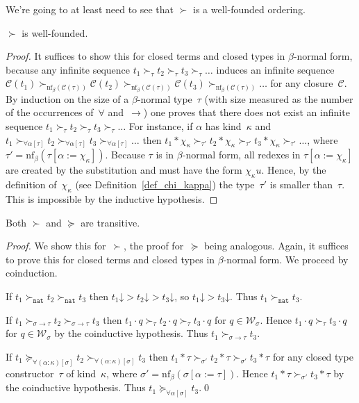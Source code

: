 \documentclass[runningheads,a4paper]{llncs}
\newcommand{\World}{\mathcal{W}}
\newcommand{\cl}{\mathcal{C}}
\newcommand{\nf}{\mathrm{nf}}
\newcommand{\arrtype}{\rightarrow}
\newcommand{\app}[2]{#1 \cdot #2}
\newcommand{\tapp}[2]{#1 * #2}
\newcommand{\subst}[2]{#1:=#2}
\newcommand{\nat}{\mathtt{nat}}
\newcommand{\da}{\mathord{\downarrow}}
\begin{document}
We're going to at least need to see that $\succ$ is a well-founded
ordering.

\begin{lemma}
  $\succ$ is well-founded.
\end{lemma}

\begin{proof}
  It suffices to show this for closed terms and closed types in
  $\beta$-normal form, because any infinite sequence $t_1 \succ_\tau
  t_2 \succ_\tau t_3 \succ_\tau \ldots$ induces an infinite sequence
  $\cl(t_1) \succ_{\nf_\beta(\cl(\tau))} \cl(t_2)
  \succ_{\nf_\beta(\cl(\tau))} \cl(t_3) \succ_{\nf_\beta(\cl(\tau))}
  \ldots$ for any closure~$\cl$. By induction on the size of a
  $\beta$-normal type~$\tau$ (with size measured as the number of the
  occurrences of~$\forall$ and~$\arrtype$) one proves that there does
  not exist an infinite sequence $t_1 \succ_\tau t_2 \succ_\tau t_3
  \succ_\tau \ldots$ For instance, if $\alpha$ has kind~$\kappa$ and
  $t_1 \succ_{\forall\alpha[\tau]} t_2 \succ_{\forall\alpha[\tau]} t_3
  \succ_{\forall\alpha[\tau]} \ldots$ then $\tapp{t_1}{\chi_\kappa}
  \succ_{\tau'} \tapp{t_2}{\chi_\kappa} \succ_{\tau'}
  \tapp{t_3}{\chi_\kappa} \succ_{\tau'} \ldots$, where
  $\tau'=\nf_\beta(\tau[\subst{\alpha}{\chi_\kappa}])$. Because $\tau$
  is in $\beta$-normal form, all redexes in
  $\tau[\subst{\alpha}{\chi_\kappa}]$ are created by the substitution
  and must have the form $\chi_\kappa u$. Hence, by the definition
  of~$\chi_\kappa$ (see Definition~\ref{def_chi_kappa}) the
  type~$\tau'$ is smaller than~$\tau$. This is impossible by the
  inductive hypothesis.
\end{proof}

\begin{lemma}
  Both $\succ$ and $\succeq$ are transitive.
\end{lemma}

\begin{proof}
  We show this for~$\succ$, the proof for~$\succeq$ being
  analogous. Again, it suffices to prove this for closed terms and
  closed types in $\beta$-normal form. We proceed by coinduction.

  If $t_1 \succ_\nat t_2 \succ_\nat t_3$ then $t_1\da > t_2\da >
  t_3\da$, so $t_1\da > t_3\da$. Thus $t_1 \succ_\nat t_3$.

  If $t_1 \succ_{\sigma\arrtype\tau}t_2\succ_{\sigma\arrtype\tau}t_3$
  then $\app{t_1}{q}\succ_{\tau}\app{t_2}{q}\succ_\tau\app{t_3}{q}$
  for $q \in \World_\sigma$. Hence
  $\app{t_1}{q}\succ_\tau\app{t_3}{q}$ for $q \in \World_\sigma$ by
  the coinductive hypothesis. Thus $t_1\succ_{\sigma\arrtype\tau}
  t_3$.

  If $t_1
  \succeq_{\forall(\alpha:\kappa)[\sigma]}t_2\succ_{\forall(\alpha:\kappa)[\sigma]}t_3$
  then
  $\tapp{t_1}{\tau}\succ_{\sigma'}\tapp{t_2}{\tau}\succ_{\sigma'}\tapp{t_3}{\tau}$
  for any closed type constructor~$\tau$ of kind~$\kappa$, where
  $\sigma' = \nf_\beta(\sigma[\subst{\alpha}{\tau}])$. Hence
  $\tapp{t_1}{\tau}\succ_{\sigma'}\tapp{t_3}{\tau}$ by the coinductive
  hypothesis. Thus $t_1\succeq_{\forall\alpha[\sigma]} t_3$.\qed
\end{proof}
\end{document}
